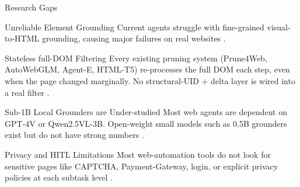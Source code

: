 \begin{frame}{Research Gaps}
  \footnotesize
  \begin{block}{\small Unreliable Element Grounding}
    Current agents struggle with fine-grained visual-to-HTML grounding, causing major failures on real websites \cite{wang2025guiagentsfoundationmodels, SeeAct, Browsinglikehuman:luo2025browsing}.
  \end{block}
  \vspace{-2pt}
  \begin{block}{\small Stateless full-DOM Filtering}
    Every existing pruning system (Prune4Web, AutoWebGLM, Agent-E, HTML-T5) re-processes the full DOM each step, even when the page changed marginally. No structural-UID + delta layer is wired into a real filter \cite{zhang2025prune4web, tarsariya2024agente, lai2024autowebglm, gur2024webagent}.
  \end{block}
  \vspace{-2pt}
  \begin{block}{\small Sub-1B Local Grounders are Under-studied}
    Most web agents are dependent on GPT-4V or Qwen2.5VL-3B. Open-weight small models such as 0.5B grounders exist but do not have strong numbers \cite{zhang2025prune4web}.
  \end{block}
  \vspace{-2pt}
  \begin{block}{\small Privacy and HITL Limitations}
    Most web-automation tools do not look for sensitive pages like CAPTCHA, Payment-Gateway, login, or explicit privacy policies at each subtask level \cite{zhang2025largelanguagemodelbrainedgui, ning2025surveywebagentsnextgenerationai}.
  \end{block}
\end{frame}

